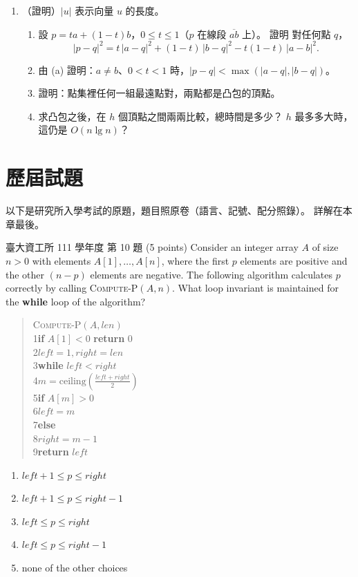 \begin{enumerate}
\item \label{dc-q-far}（證明）$|u|$ 表示向量 $u$ 的長度。
\begin{enumerate}
\item 設 $p = t a + (1 - t) b$，$0 \le t \le 1$（$p$ 在線段 $\overline{ab}$ 上）。 證明
對任何點 $q$，
\[
|p - q|^2 = t\,|a - q|^2 + (1 - t)\,|b - q|^2 - t(1 - t)\,|a - b|^2 .
\]
\item 由 (a) 證明：$a \ne b$、$0 < t < 1$ 時，$|p - q| < \max(|a - q|, |b - q|)$。
\item 證明：點集裡任何一組最遠點對，兩點都是凸包的頂點。
\item 求凸包之後，在 $h$ 個頂點之間兩兩比較，總時間是多少？ $h$ 最多多大時，這仍是
$O(n \lg n)$？
\end{enumerate}

\end{enumerate}

\section{歷屆試題}
\label{sec:dc-pastexam}

以下是研究所入學考試的原題，題目照原卷（語言、記號、配分照錄）。 詳解在本章最後。

\begin{pastexam}[label={px:dc-1}]{臺大資工所 111 學年度 第 10 題}
(5 points) Consider an integer array $A$ of size $n>0$ with elements $A[1],\ldots,A[n]$,
where the first $p$ elements are positive and the other $(n-p)$ elements are negative. The
following algorithm calculates $p$ correctly by calling \textsc{Compute-P}$(A,n)$. What loop
invariant is maintained for the \textbf{while} loop of the algorithm?

\begin{quote}
\textsc{Compute-P}$(A, len)$\\
1\quad \textbf{if} $A[1]<0$ \textbf{return} 0\\
2\quad $left=1, right=len$\\
3\quad \textbf{while} $left<right$\\
4\quad\quad $m=\text{ceiling}(\frac{left+right}{2})$\\
5\quad\quad \textbf{if} $A[m]>0$\\
6\quad\quad\quad $left=m$\\
7\quad\quad \textbf{else}\\
8\quad\quad\quad $right=m-1$\\
9\quad \textbf{return} $left$
\end{quote}
\begin{enumerate}[label=(\Alph*)]
\item $left+1\le p\le right$
\item $left+1\le p\le right-1$
\item $left\le p\le right$
\item $left\le p\le right-1$
\item none of the other choices
\end{enumerate}
\end{pastexam}

